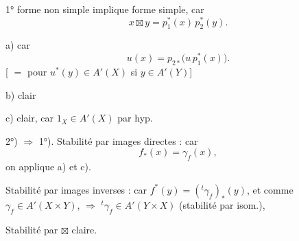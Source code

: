 \documentclass[11pt,a4paper]{article}
\begin{document}
1° forme non simple implique forme simple, car
\[ x \boxtimes y = p_{1}^{*}(x)\, p_{2}^{*}(y) . \]

a) car
\[ u(x) = p_{2*}\bigl( u\, p_{1}^{*}(x) \bigr) . \]
[\ill{} $=$ pour $u^{*}(y) \in A'(X)$ si $y \in A'(Y)$]

b) clair

c) clair, car $1_{X} \in A'(X)$ par hyp.

2°) $\Rightarrow$ 1°). Stabilité par images \struck{\ill{}} directes : car
\[ f_{*}(x) = \gamma_{f}(x) , \]
on applique a) et c).


Stabilité par images  inverses : car
$f^{*}(y) = ({}^{t}\gamma_{f})_{*}(y)$, et comme
$\gamma_{f} \in A'(X \times Y)$, $\Rightarrow$
${}^{t}\gamma_{f} \in A'(Y \times X)$ (stabilité par isom.),

Stabilité par $\boxtimes$ claire.

\end{document}
